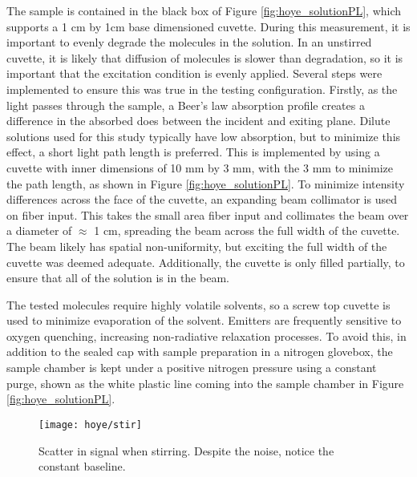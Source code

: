 \documentclass[../thesis.tex]{subfiles}
\begin{document}
The sample is contained in the black box of Figure \ref{fig:hoye_solutionPL}, which supports a 1 cm by 1cm base dimensioned cuvette.
During this measurement, it is important to evenly degrade the molecules in the solution.
In an unstirred cuvette, it is likely that diffusion of molecules is slower than degradation, so it is important that the excitation condition is evenly applied.
Several steps were implemented to ensure this was true in the testing configuration.
Firstly, as the light passes through the sample, a Beer's law absorption profile creates a difference in the absorbed does between the incident and exiting plane.
Dilute solutions used for this study typically have low absorption, but to minimize this effect, a short light path length is preferred.
This is implemented by using a cuvette with inner dimensions of 10 mm by 3 mm, with the 3 mm to minimize the path length, as shown in Figure \ref{fig:hoye_solutionPL}.
To minimize intensity differences across the face of the cuvette, an expanding beam collimator is used on fiber input.  
This takes the small area fiber input and collimates the beam over a diameter of $\approx$ 1 cm, spreading the beam across the full width of the cuvette.
The beam likely has spatial non-uniformity, but exciting the full width of the cuvette was deemed adequate.
Additionally, the cuvette is only filled partially, to ensure that all of the solution is in the beam.


The tested molecules require highly volatile solvents, so a screw top cuvette is used to minimize evaporation of the solvent.
Emitters are frequently sensitive to oxygen quenching, increasing non-radiative relaxation processes.\supercite{Endo2008,Schueppel2007,Baldo2000}
To avoid this, in addition to the sealed cap with sample preparation in a nitrogen glovebox, the sample chamber is kept under a positive nitrogen pressure using a constant purge, shown as the white plastic line coming into the sample chamber in Figure \ref{fig:hoye_solutionPL}.

\begin{wrapfigure}{r}{.5\textwidth}
\centering
\texttt{[image: hoye/stir]}
\caption{Scatter in signal when stirring.  Despite the noise, notice the constant baseline.}
\label{fig:hoye_stir}
\end{wrapfigure}
\end{document}
